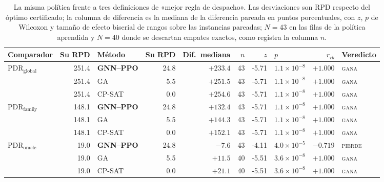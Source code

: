 \begin{table}[t]
\caption{La misma política frente a tres definiciones de «mejor regla de despacho». Las desviaciones son RPD respecto del óptimo certificado; la columna de diferencia es la mediana de la diferencia pareada en puntos porcentuales, con $z$, $p$ de Wilcoxon y tamaño de efecto biserial de rangos sobre las instancias pareadas; $N=43$ en las filas de la política aprendida y $N=40$ donde se descartan empates exactos, como registra la columna $n$.}\label{tbl:comparators}
\begin{tabular*}{\tblwidth}{@{}LrLrrrrlrl@{}}
\toprule
Comparador & Su RPD & Método & Su RPD & Dif.\ mediana & $n$ & $z$ & $p$ & $r_{rb}$ & Veredicto \\
\midrule
$\mathrm{PDR}_{\mathrm{global}}$ & 251.4 & \textbf{GNN--PPO} & 24.8 & $+233.4$ & 43 & -5.71 & $1.1\times10^{-8}$ & $+1.000$ & \textsc{gana} \\
 & 251.4 & GA & 5.5 & $+251.5$ & 43 & -5.71 & $1.1\times10^{-8}$ & $+1.000$ & \textsc{gana} \\
 & 251.4 & CP-SAT & 0.0 & $+254.6$ & 43 & -5.71 & $1.1\times10^{-8}$ & $+1.000$ & \textsc{gana} \\
$\mathrm{PDR}_{\mathrm{family}}$ & 148.1 & \textbf{GNN--PPO} & 24.8 & $+132.4$ & 43 & -5.71 & $1.1\times10^{-8}$ & $+1.000$ & \textsc{gana} \\
 & 148.1 & GA & 5.5 & $+144.3$ & 43 & -5.71 & $1.1\times10^{-8}$ & $+1.000$ & \textsc{gana} \\
 & 148.1 & CP-SAT & 0.0 & $+152.1$ & 43 & -5.71 & $1.1\times10^{-8}$ & $+1.000$ & \textsc{gana} \\
$\mathrm{PDR}_{\mathrm{oracle}}$ & 19.0 & \textbf{GNN--PPO} & 24.8 & $-7.6$ & 43 & -4.11 & $4.0\times10^{-5}$ & $-0.719$ & \textsc{pierde} \\
 & 19.0 & GA & 5.5 & $+11.5$ & 40 & -5.51 & $3.6\times10^{-8}$ & $+1.000$ & \textsc{gana} \\
 & 19.0 & CP-SAT & 0.0 & $+21.1$ & 40 & -5.51 & $3.6\times10^{-8}$ & $+1.000$ & \textsc{gana} \\
\bottomrule
\end{tabular*}
\end{table}
